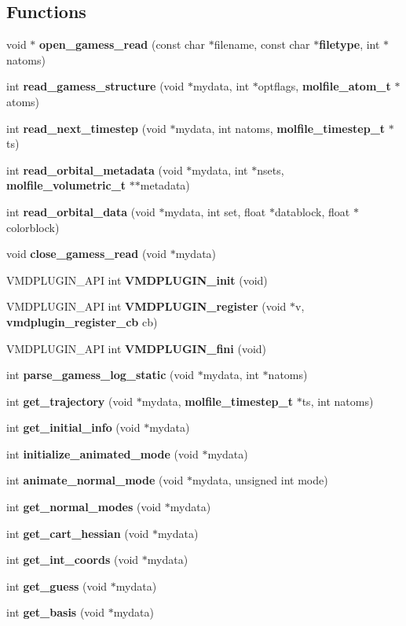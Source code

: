 \subsection*{Functions}
\begin{CompactItemize}
\item 
void $\ast$ {\bf open\_\-gamess\_\-read} (const char $\ast$filename, const char $\ast${\bf filetype}, int $\ast$natoms)
\item 
int {\bf read\_\-gamess\_\-structure} (void $\ast$mydata, int $\ast$optflags, {\bf molfile\_\-atom\_\-t} $\ast$atoms)
\item 
int {\bf read\_\-next\_\-timestep} (void $\ast$mydata, int natoms, {\bf molfile\_\-timestep\_\-t} $\ast$ts)
\item 
int {\bf read\_\-orbital\_\-metadata} (void $\ast$mydata, int $\ast$nsets, {\bf molfile\_\-volumetric\_\-t} $\ast$$\ast$metadata)
\item 
int {\bf read\_\-orbital\_\-data} (void $\ast$mydata, int set, float $\ast$datablock, float $\ast$colorblock)
\item 
void {\bf close\_\-gamess\_\-read} (void $\ast$mydata)
\item 
VMDPLUGIN\_\-API int {\bf VMDPLUGIN\_\-init} (void)
\item 
VMDPLUGIN\_\-API int {\bf VMDPLUGIN\_\-register} (void $\ast$v, {\bf vmdplugin\_\-register\_\-cb} cb)
\item 
VMDPLUGIN\_\-API int {\bf VMDPLUGIN\_\-fini} (void)
\item 
int {\bf parse\_\-gamess\_\-log\_\-static} (void $\ast$mydata, int $\ast$natoms)
\item 
int {\bf get\_\-trajectory} (void $\ast$mydata, {\bf molfile\_\-timestep\_\-t} $\ast$ts, int natoms)
\item 
int {\bf get\_\-initial\_\-info} (void $\ast$mydata)
\item 
int {\bf initialize\_\-animated\_\-mode} (void $\ast$mydata)
\item 
int {\bf animate\_\-normal\_\-mode} (void $\ast$mydata, unsigned int mode)
\item 
int {\bf get\_\-normal\_\-modes} (void $\ast$mydata)
\item 
int {\bf get\_\-cart\_\-hessian} (void $\ast$mydata)
\item 
int {\bf get\_\-int\_\-coords} (void $\ast$mydata)
\item 
int {\bf get\_\-guess} (void $\ast$mydata)
\item 
int {\bf get\_\-basis} (void $\ast$mydata)
$$
\end{CompactItemize}
